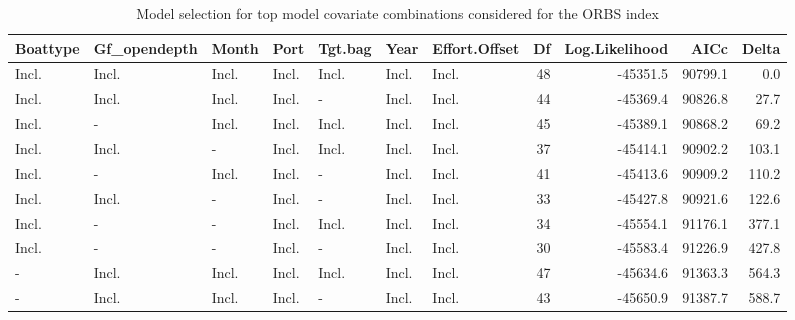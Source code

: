 \documentclass[
  english,
]{article}
\begin{document}
\begin{landscape}
\begingroup
\fontsize{9.0pt}{11.0pt}\selectfont

\begin{longtable}{lllllllrrrr}

\caption{\label{tbl-yelloweye_model_selection_ORBS}Model selection for
top model covariate combinations considered for the ORBS index}

\tabularnewline

\toprule
Boattype & Gf\_opendepth & Month & Port & Tgt.bag & Year & Effort.Offset & Df & Log.Likelihood & AICc & Delta \\ 
\midrule\addlinespace[2.5pt]
Incl. & Incl. & Incl. & Incl. & Incl. & Incl. & Incl. & 48 & -45351.5 & 90799.1 & 0.0 \\ 
Incl. & Incl. & Incl. & Incl. & - & Incl. & Incl. & 44 & -45369.4 & 90826.8 & 27.7 \\ 
Incl. & - & Incl. & Incl. & Incl. & Incl. & Incl. & 45 & -45389.1 & 90868.2 & 69.2 \\ 
Incl. & Incl. & - & Incl. & Incl. & Incl. & Incl. & 37 & -45414.1 & 90902.2 & 103.1 \\ 
Incl. & - & Incl. & Incl. & - & Incl. & Incl. & 41 & -45413.6 & 90909.2 & 110.2 \\ 
Incl. & Incl. & - & Incl. & - & Incl. & Incl. & 33 & -45427.8 & 90921.6 & 122.6 \\ 
Incl. & - & - & Incl. & Incl. & Incl. & Incl. & 34 & -45554.1 & 91176.1 & 377.1 \\ 
Incl. & - & - & Incl. & - & Incl. & Incl. & 30 & -45583.4 & 91226.9 & 427.8 \\ 
- & Incl. & Incl. & Incl. & Incl. & Incl. & Incl. & 47 & -45634.6 & 91363.3 & 564.3 \\ 
- & Incl. & Incl. & Incl. & - & Incl. & Incl. & 43 & -45650.9 & 91387.7 & 588.7 \\ 
\bottomrule

\end{longtable}

\endgroup

\end{landscape}

\newpage{}

\begingroup
\fontsize{9.0pt}{11.0pt}\selectfont
\end{document}
